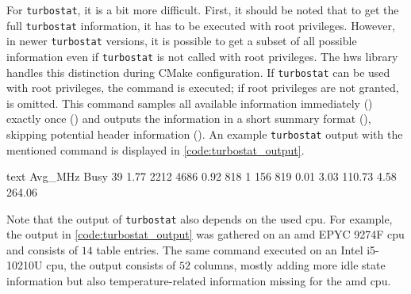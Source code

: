 For \texttt{turbostat}, it is a bit more difficult. 
First, it should be noted that to get the full \texttt{turbostat} information, it has to be executed with root privileges. 
However, in newer \texttt{turbostat} versions, it is possible to get a subset of all possible information even if \texttt{turbostat} is not called with root privileges. 
The hws library handles this distinction during CMake configuration. 
If \texttt{turbostat} can be used with root privileges, the command  is executed; if root privileges are not granted,  is omitted. 
This command samples all available information immediately () exactly once () and outputs the information in a short summary format (), skipping potential header information (). 
An example \texttt{turbostat} output with the mentioned command is displayed in \autoref{code:turbostat_output}. 
\begin{listing}
    \begin{moderncode}{text}
Avg_MHz  Busy%
39       1.77   2212     4686     0.92  818  1     156  819  0.01   3.03  110.73  4.58     264.06
    \end{moderncode}
    \caption{%
    An example output of the turbostat command  with root privileges enabled on an \gls{amd} EPYC 9274F \gls{cpu}.
    }
    \label{code:turbostat_output}
\end{listing}
Note that the output of \texttt{turbostat} also depends on the used \gls{cpu}. 
For example, the output in \autoref{code:turbostat_output} was gathered on an \gls{amd} EPYC 9274F \gls{cpu} and consists of $14$ table entries. 
The same command executed on an Intel i5-10210U \gls{cpu}, the output consists of $52$ columns, mostly adding more idle state information but also temperature-related information missing for the \gls{amd} \gls{cpu}.
